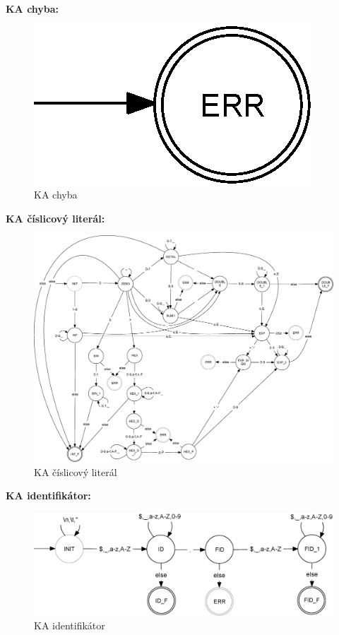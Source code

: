 \documentclass[a4paper,11pt]{article}
\begin{document}
\newpage
\textbf{KA chyba:} %
\begin{figure}[H]
\centering
\includegraphics[scale=.31]{FSM_ERR.eps}
\caption{KA chyba}
\end{figure}

\textbf{KA číslicový literál:} %
\begin{figure}[H]
\centering
\includegraphics[scale=.31]{FSM_NUM.eps}
\caption{KA číslicový literál}
\end{figure}


\textbf{KA identifikátor:} %
\begin{figure}[H]
\centering
\includegraphics[scale=.31]{FSM_ID.eps}
\caption{KA identifikátor}
\end{figure}
\end{document}
